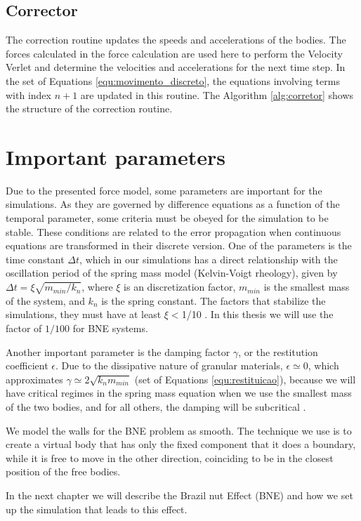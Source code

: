 

\subsection{Corrector}
    The correction routine updates the speeds and accelerations of the bodies. The forces calculated in the force calculation are used here to perform the Velocity Verlet and determine the velocities and accelerations for the next time step. In the set of Equations \ref{equ:movimento_discreto}, the equations involving terms with index $n+1$ are updated in this routine. The Algorithm \ref{alg:corretor} shows the structure of the correction routine.



\section{Important parameters}
    Due to the presented force model, some parameters are important for the simulations. As they are governed by difference equations as a function of the temporal parameter, some criteria must be obeyed for the simulation to be stable. These conditions are related to the error propagation when continuous equations are transformed in their discrete version. One of the parameters is the time constant $\Delta t$, which in our simulations has a direct relationship with the oscillation period of the spring mass model (Kelvin-Voigt rheology), given by $\Delta t = \xi \sqrt{m_{min}/k_{n}}$, where $\xi$ is an discretization factor, $m_{min}$ is the smallest mass of the system, and $k_{n}$ is the spring constant. The factors that stabilize the simulations, they must have at least $\xi < $1/10 \cite{Dissertacao, Caio-Tese, Computer_Simulation_of_Liquids}. In this thesis we will use the factor of $1/100$ for BNE systems. 

    Another important parameter is the damping factor $\gamma$, or the restitution coefficient $\epsilon$. Due to the dissipative nature of granular materials, $\epsilon \simeq 0$, which approximates $\gamma \simeq 2\sqrt{k_{n}{m}_{min}}$ (set of Equations \ref{equ:restituicao}), because we will have critical regimes in the spring mass equation when we use the smallest mass of the two bodies, and for all others, the damping will be subcritical \cite{Bouzid-Tese, Luding-Tese}. 

    We model the walls for the BNE problem as smooth. The technique we use is to create a virtual body that has only the fixed component that it does a boundary, while it is free to move in the other direction, coinciding to be in the closest position of the free bodies.

    In the next chapter we will describe the Brazil nut Effect (BNE) and how we set up the simulation that leads to this effect.
